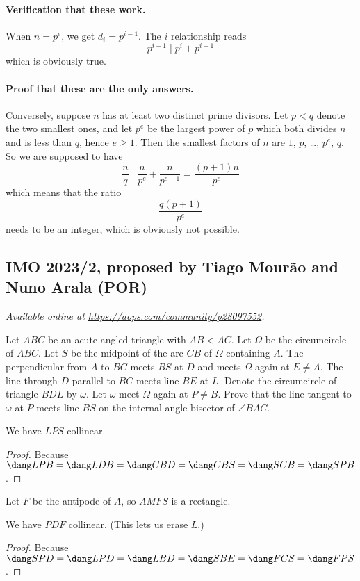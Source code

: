 \documentclass[11pt]{scrartcl}
\begin{document}
\paragraph{Verification that these work.}
When $n = p^e$, we get $d_i = p^{i-1}$.
The $i$ relationship reads \[ p^{i-1} \mid p^i + p^{i+1} \]
which is obviously true.

\paragraph{Proof that these are the only answers.}
Conversely, suppose $n$ has at least two distinct prime divisors.
Let $p < q$ denote the two smallest ones,
and let $p^e$ be the largest power of $p$ which both divides $n$
and is less than $q$, hence $e \ge 1$.
Then the smallest factors of $n$ are $1$, $p$, \dots, $p^e$, $q$.
So we are supposed to have
\[ \frac{n}{q} \mid \frac{n}{p^e} + \frac{n}{p^{e-1}}
    = \frac{(p+1)n}{p^e} \]
which means that the ratio
\[ \frac{q(p+1)}{p^e} \]
needs to be an integer, which is obviously not possible.
\pagebreak

\subsection{IMO 2023/2, proposed by Tiago Mourão and Nuno Arala (POR)}
\textsl{Available online at \url{https://aops.com/community/p28097552}.}
\begin{mdframed}[style=mdpurplebox,frametitle={Problem statement}]
Let $ABC$ be an acute-angled triangle with $AB < AC$.
Let $\Omega$ be the circumcircle of $ABC$.
Let $S$ be the midpoint of the arc $CB$ of $\Omega$ containing $A$.
The perpendicular from $A$ to $BC$ meets $BS$ at $D$ and meets $\Omega$ again at $E \neq A$.
The line through $D$ parallel to $BC$ meets line $BE$ at $L$.
Denote the circumcircle of triangle $BDL$ by $\omega$.
Let $\omega$ meet $\Omega$ again at $P \neq B$.
Prove that the line tangent to $\omega$ at $P$ meets line $BS$
on the internal angle bisector of $\angle BAC$.
\end{mdframed}
\begin{claim*}
  We have $LPS$ collinear.
\end{claim*}
\begin{proof}
  Because $\dang LPB = \dang LDB = \dang CBD = \dang CBS = \dang SCB = \dang SPB$.
\end{proof}

Let $F$ be the antipode of $A$, so $AMFS$ is a rectangle.
\begin{claim*}
  We have $PDF$ collinear. (This lets us erase $L$.)
\end{claim*}
\begin{proof}
   Because $\dang SPD = \dang LPD = \dang LBD = \dang SBE = \dang FCS = \dang FPS$.
\end{proof}
\end{document}
